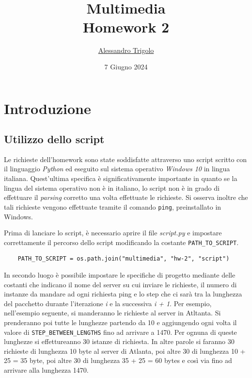 \title{\vspace{160px} \textbf{\huge{Multimedia}} \\\vspace{17.5px} \LARGE{Homework 2}  \vspace{10px}}
\author{\href{https://github.com/imAlessas}{Alessandro Trigolo}}
\date{7 Giugno 2024}



\maketitle\newpage

\tableofcontents
\vspace{50px}
\listoffigures
\newpage

\listoftodos\newpage

\section{Introduzione}

\vspace{15px}\subsection{Utilizzo dello script}

Le richieste dell'homework sono state soddisfatte attraverso uno script scritto con il linguaggio \textsl{Python} ed eseguito sul sistema operativo \textsl{Windows 10} in lingua italiana. Quest'ultima specifica è significativamente importante in quanto se la lingua del sistema operativo non è in italiano, lo script non è in grado di effettuare il \textsl{parsing} corretto una volta effettuate le richieste. Si osserva inoltre che tali richieste vengono effettuate tramite il comando \texttt{ping}, preinstallato in Windows.

Prima di lanciare lo script, è necessario aprire il file \textsl{script.py} e impostare correttamente il percorso dello script modificando la costante \texttt{PATH\_TO\_SCRIPT}.
\begin{lstlisting}
    PATH_TO_SCRIPT = os.path.join("multimedia", "hw-2", "script")
\end{lstlisting}

\noindent In secondo luogo è possibile impostare le specifiche di progetto mediante delle costanti che indicano il nome del server su cui inviare le richieste, il numero di instanze da mandare ad ogni richiesta ping e lo step che ci sarà tra la lunghezza del pacchetto durante l'iterazione \textit{i} e la successiva \textit{i + 1}. Per esempio, nell'esempio seguente, si manderanno le richieste al server in Atltanta. Si prenderanno poi tutte le lunghezze partendo da 10 e aggiungendo ogni volta il valore di \texttt{STEP\_BETWEEN\_LENGTHS} fino ad arrivare a 1470. Per ognuna di queste lunghezze si effettureanno 30 istanze di richiesta. In altre parole si faranno 30 richieste di lunghezza 10 byte al server di Atlanta, poi altre 30 di lunghezza 10 + 25 = 35 byte, poi altre 30 di lunghezza 35 + 25 = 60 bytes e così via fino ad arrivare alla lunghezza 1470.

